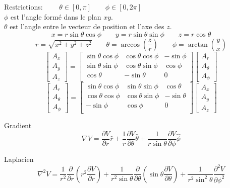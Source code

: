 \documentclass[10pt,landscape]{article}
\newcommand{\extraline}{\vspace{1em}}
\begin{document}
\begin{multicols}{3}
Restrictions: $\qquad\theta\in[0,\pi] \qquad \phi\in[0,2\pi]$ \\
$\phi$ est l'angle formé dans le plan $xy$. \\
$\theta$ est l'angle entre le vecteur de position et l'axe des $z$.
%
\[ x = r\sin\theta\cos\phi \qquad y =  r\sin\theta\sin\phi \qquad z= r\cos\theta  \]
\[ r = \sqrt{x^2 + y^2 + z^2} \qquad \theta = \arccos\left(\frac{z}{r}\right) \qquad \phi = \arctan\left(\frac{y}{x}\right) \]
%
\[
\begin{bmatrix}
	A_x \\ A_y \\ A_z
\end{bmatrix}
=
\begin{bmatrix}
	\sin\theta\cos\phi & \cos\theta\cos\phi & -\sin\phi \\
	\sin\theta\sin\phi & \cos\theta\sin\phi & \cos\phi \\
	\cos\theta & -\sin\theta  & 0 \\
\end{bmatrix}
\begin{bmatrix}
	A_r \\ A_\theta \\ A_\phi
\end{bmatrix}
\]
\[
\begin{bmatrix}
	A_r \\ A_\theta \\ A_\phi
\end{bmatrix}
=
\begin{bmatrix}
	\sin\theta\cos\phi & \sin\theta\sin\phi & \cos\theta\\
	\cos\theta\cos\phi & \cos\theta\sin\phi & -\sin\theta\\
	-\sin\phi & \cos\phi  & 0 \\
\end{bmatrix}
\begin{bmatrix}
	A_x \\ A_y \\ A_z
\end{bmatrix}
\]

\extraline
Gradient
\[ \nabla V = \frac{\partial V}{\partial r}\hat{r} + \frac{1}{r}\frac{\partial V}{\partial \theta}\hat{\theta} + \frac{1}{r\sin\theta}\frac{\partial V}{\partial \phi}\hat{\phi} \]

Laplacien
\[ \nabla^2 V = \frac{1}{r^2} \frac{\partial}{\partial r}\left( r^2 \frac{\partial V}{\partial r} \right)
+ \frac{1}{r^2\sin\theta}\frac{\partial}{\partial \theta} \left( \sin\theta \frac{\partial V}{\partial\theta} \right)
+ \frac{1}{r^2\sin^2\theta}\frac{\partial^2 V}{\partial \phi^2} \]


\end{multicols}
\end{document}
